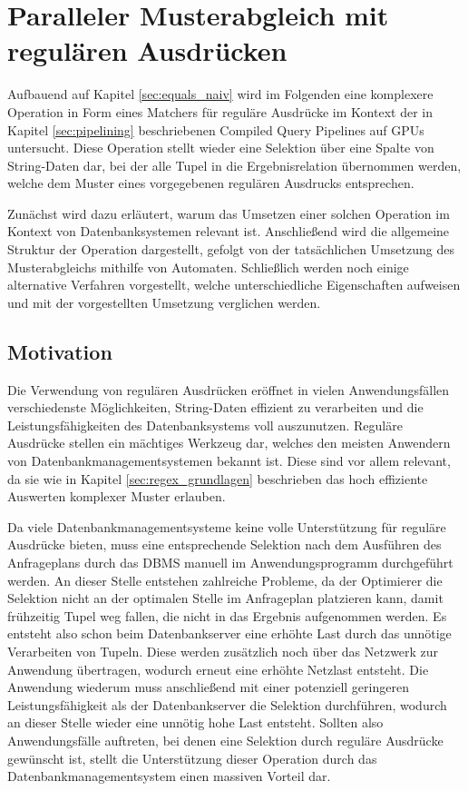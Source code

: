 \chapter{Paralleler Musterabgleich mit regulären Ausdrücken}
\label{sec:regex_naiv}

Aufbauend auf Kapitel \ref{sec:equals_naiv} wird im Folgenden eine komplexere Operation in Form eines Matchers für reguläre Ausdrücke im Kontext der in Kapitel \ref{sec:pipelining} beschriebenen Compiled Query Pipelines auf GPUs untersucht.
Diese Operation stellt wieder eine Selektion über eine Spalte von String-Daten dar, bei der alle Tupel in die Ergebnisrelation übernommen werden, welche dem Muster eines vorgegebenen regulären Ausdrucks entsprechen.

Zunächst wird dazu erläutert, warum das Umsetzen einer solchen Operation im Kontext von Datenbanksystemen relevant ist.
Anschließend wird die allgemeine Struktur der Operation dargestellt, gefolgt von der tatsächlichen Umsetzung des Musterabgleichs mithilfe von Automaten.
Schließlich werden noch einige alternative Verfahren vorgestellt, welche unterschiedliche Eigenschaften aufweisen und mit der vorgestellten Umsetzung verglichen werden.

\section{Motivation}

Die Verwendung von regulären Ausdrücken eröffnet in vielen Anwendungsfällen verschiedenste Möglichkeiten, String-Daten effizient zu verarbeiten und die Leistungsfähigkeiten des Datenbanksystems voll auszunutzen.
Reguläre Ausdrücke stellen ein mächtiges Werkzeug dar, welches den meisten Anwendern von Datenbankmanagementsystemen bekannt ist.
Diese sind vor allem relevant, da sie wie in Kapitel \ref{sec:regex_grundlagen} beschrieben das hoch effiziente Auswerten komplexer Muster erlauben.

Da viele Datenbankmanagementsysteme keine volle Unterstützung für reguläre Ausdrücke bieten, muss eine entsprechende Selektion nach dem Ausführen des Anfrageplans durch das DBMS manuell im Anwendungsprogramm durchgeführt werden.
An dieser Stelle entstehen zahlreiche Probleme, da der Optimierer die Selektion nicht an der optimalen Stelle im Anfrageplan platzieren kann, damit frühzeitig Tupel weg fallen, die nicht in das Ergebnis aufgenommen werden.
Es entsteht also schon beim Datenbankserver eine erhöhte Last durch das unnötige Verarbeiten von Tupeln.
Diese werden zusätzlich noch über das Netzwerk zur Anwendung übertragen, wodurch erneut eine erhöhte Netzlast entsteht.
Die Anwendung wiederum muss anschließend mit einer potenziell geringeren Leistungsfähigkeit als der Datenbankserver die Selektion durchführen, wodurch an dieser Stelle wieder eine unnötig hohe Last entsteht.
Sollten also Anwendungsfälle auftreten, bei denen eine Selektion durch reguläre Ausdrücke gewünscht ist, stellt die Unterstützung dieser Operation durch das Datenbankmanagementsystem einen massiven Vorteil dar.

